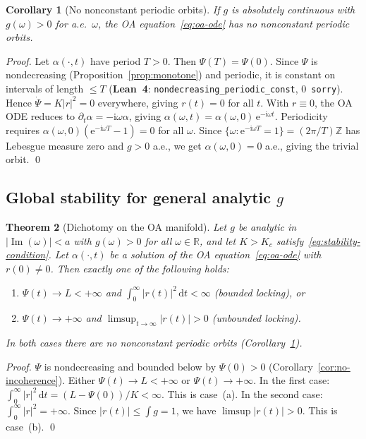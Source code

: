 \documentclass[11pt,a4paper]{article}
\newtheorem{theorem}{Theorem}[section]
\newtheorem{corollary}[theorem]{Corollary}
\theoremstyle{definition}
\DeclareMathOperator{\im}{Im}
\newcommand{\R}{\mathbb{R}}
\begin{document}
\begin{corollary}[No nonconstant periodic orbits]\label{cor:no-periodic}
If $g$ is absolutely continuous with $g(\omega) > 0$ for a.e.\ $\omega$, the OA equation~\eqref{eq:oa-ode} has no nonconstant periodic orbits.
\end{corollary}

\begin{proof}
Let $\alpha(\cdot,t)$ have period $T > 0$. Then $\Psi(T) = \Psi(0)$. Since $\Psi$ is nondecreasing (Proposition~\ref{prop:monotone}) and periodic, it is constant on intervals of length $\leq T$ (\textbf{Lean~4}: \texttt{nondecreasing\_periodic\_const}, 0~\texttt{sorry}). Hence $\dot{\Psi} = K|r|^2 = 0$ everywhere, giving $r(t) = 0$ for all $t$. With $r \equiv 0$, the OA ODE reduces to $\partial_t\alpha = -\mathrm{i}\omega\alpha$, giving $\alpha(\omega,t) = \alpha(\omega,0)\,\mathrm{e}^{-\mathrm{i}\omega t}$. Periodicity requires $\alpha(\omega,0)(\mathrm{e}^{-\mathrm{i}\omega T} - 1) = 0$ for all $\omega$. Since $\{\omega : \mathrm{e}^{-\mathrm{i}\omega T} = 1\} = (2\pi/T)\mathbb{Z}$ has Lebesgue measure zero and $g > 0$ a.e., we get $\alpha(\omega,0) = 0$ a.e., giving the trivial orbit. \qed
\end{proof}

\subsection{Global stability for general analytic $g$}

\begin{theorem}[Dichotomy on the OA manifold]\label{thm:oa-global}
Let $g$ be analytic in $|\im(\omega)| < a$ with $g(\omega) > 0$ for all $\omega \in \R$, and let $K > K_c$ satisfy~\eqref{eq:stability-condition}. Let $\alpha(\cdot, t)$ be a solution of the OA equation~\eqref{eq:oa-ode} with $r(0) \neq 0$. Then exactly one of the following holds:
\begin{enumerate}[label=(\alph*)]
\item $\Psi(t) \to L < +\infty$ and $\int_0^\infty |r(t)|^2\,\mathrm{d}t < \infty$ (bounded locking), or
\item $\Psi(t) \to +\infty$ and $\limsup_{t \to \infty}|r(t)| > 0$ (unbounded locking).
\end{enumerate}
In both cases there are no nonconstant periodic orbits (Corollary~\ref{cor:no-periodic}).
\end{theorem}

\begin{proof}
$\Psi$ is nondecreasing and bounded below by $\Psi(0) > 0$ (Corollary~\ref{cor:no-incoherence}). Either $\Psi(t) \to L < +\infty$ or $\Psi(t) \to +\infty$. In the first case: $\int_0^\infty |r|^2\,\mathrm{d}t = (L - \Psi(0))/K < \infty$. This is case~(a). In the second case: $\int_0^\infty |r|^2 = +\infty$. Since $|r(t)| \leq \int g = 1$, we have $\limsup |r(t)| > 0$. This is case~(b). \qed
\end{proof}
\end{document}
